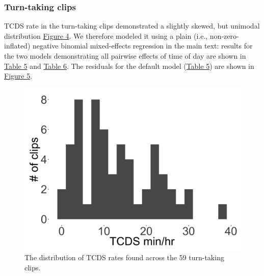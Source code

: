 \documentclass[floatsintext,man]{apa6}
\theoremstyle{definition}
\theoremstyle{definition}
\theoremstyle{definition}
\theoremstyle{remark}
\begin{document}
\FloatBarrier

\subsubsection{Turn-taking clips}\label{models-tcds-turntaking}

TCDS rate in the turn-taking clips demonstrated a slightly skewed, but
unimodal distribution \protect\hyperlink{fig4}{Figure 4}. We therefore
modeled it using a plain (i.e., non-zero-inflated) negative binomial
mixed-effects regression in the main text: results for the two models
demonstrating all pairwise effects of time of day are shown in
\protect\hyperlink{tab5}{Table 5} and \protect\hyperlink{tab6}{Table 6}.
The residuals for the default model (\protect\hyperlink{tab5}{Table 5})
are shown in \protect\hyperlink{fig5}{Figure 5}.

\FloatBarrier

\begin{figure}[H]

{\centering \includegraphics[width=0.4\linewidth]{www/TCDS_turntaking_distribution} 

}

\caption{The distribution of TCDS rates found across the 59 turn-taking clips.}\label{fig:fig4}
\end{figure}

\FloatBarrier
\end{document}
